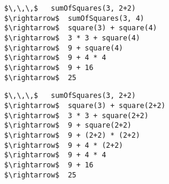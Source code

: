 \begin{lstlisting}
$\,\,\,$   sumOfSquares(3, 2+2)
$\rightarrow$  sumOfSquares(3, 4)
$\rightarrow$  square(3) + square(4)
$\rightarrow$  3 * 3 + square(4)
$\rightarrow$  9 + square(4)
$\rightarrow$  9 + 4 * 4
$\rightarrow$  9 + 16
$\rightarrow$  25
\end{lstlisting}

\begin{lstlisting}
$\,\,\,$   sumOfSquares(3, 2+2)
$\rightarrow$  square(3) + square(2+2)
$\rightarrow$  3 * 3 + square(2+2)
$\rightarrow$  9 + square(2+2)
$\rightarrow$  9 + (2+2) * (2+2)
$\rightarrow$  9 + 4 * (2+2)
$\rightarrow$  9 + 4 * 4
$\rightarrow$  9 + 16
$\rightarrow$  25
\end{lstlisting}




